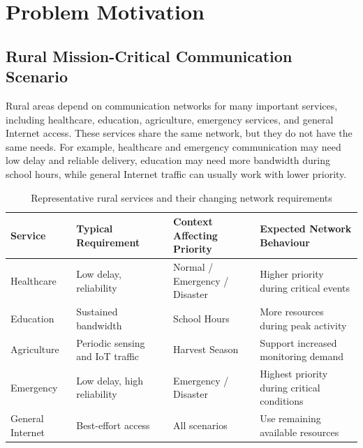 \documentclass[12pt,a4paper]{report}
\begin{document}
	
	\chapter{Problem Motivation}
	\label{chap:introduction}
	

\section{Rural Mission-Critical Communication Scenario}
\label{sec:rural_scenario}

Rural areas depend on communication networks for many important services,
including healthcare, education, agriculture, emergency services, and
general Internet access. These services share the same network, but they
do not have the same needs. For example, healthcare and emergency
communication may need low delay and reliable delivery, education may
need more bandwidth during school hours, while general Internet traffic
can usually work with lower priority.


\begin{table}[H]
	\centering
	\caption{Representative rural services and their changing network
		requirements}
	\label{tab:service_requirements}
	\begin{tabular}{p{2.8cm} p{3.2cm} p{3.4cm} p{3.6cm}}
		\toprule
		\textbf{Service} &
		\textbf{Typical Requirement} &
		\textbf{Context Affecting Priority} &
		\textbf{Expected Network Behaviour} \\
		\midrule
		
		Healthcare &
		Low delay, reliability &
		Normal / Emergency / Disaster &
		Higher priority during critical events \\
		
		Education &
		Sustained bandwidth &
		School Hours &
		More resources during peak activity \\
		
		Agriculture &
		Periodic sensing and IoT traffic &
		Harvest Season &
		Support increased monitoring demand \\
		
		Emergency &
		Low delay, high reliability &
		Emergency / Disaster &
		Highest priority during critical conditions \\
		
		General Internet &
		Best-effort access &
		All scenarios &
		Use remaining available resources \\
		
		\bottomrule
	\end{tabular}
\end{table}
\end{document}
